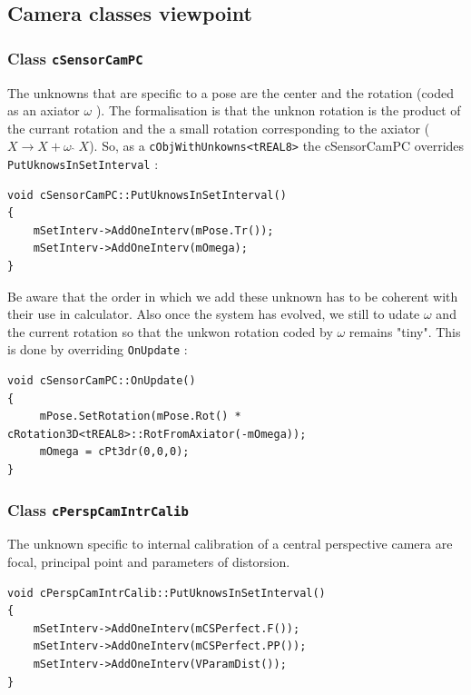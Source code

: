\subsection{Camera classes viewpoint}


\subsubsection{Class {\tt cSensorCamPC}}

The unknowns that are specific to a pose are the center  and  the rotation (coded as an axiator $\omega$ ).
The  formalisation is that the unknon rotation is the product of the currant rotation
and the a small rotation corresponding to the axiator ($X \rightarrow X + \omega\; \hat{}\; X$).
So, as a    {\tt cObjWithUnkowns<tREAL8>} the cSensorCamPC overrides {\tt PutUknowsInSetInterval} :

\begin{lstlisting}
void cSensorCamPC::PutUknowsInSetInterval()
{
    mSetInterv->AddOneInterv(mPose.Tr());
    mSetInterv->AddOneInterv(mOmega);
}
\end{lstlisting}

Be aware that the order in which we add these unknown has to be coherent with their use in calculator.
Also once the system has evolved, we still to udate $\omega$  and the current rotation
so that the unkwon rotation coded by $\omega$  remains "tiny". This is done  by
overriding {\tt OnUpdate} :


\begin{lstlisting}
void cSensorCamPC::OnUpdate()
{
     mPose.SetRotation(mPose.Rot() * cRotation3D<tREAL8>::RotFromAxiator(-mOmega));
     mOmega = cPt3dr(0,0,0);
}
\end{lstlisting}

\subsubsection{Class {\tt cPerspCamIntrCalib}}

The unknown specific to internal calibration of a central perspective camera are focal, principal 
point and parameters of distorsion. 


\begin{lstlisting}
void cPerspCamIntrCalib::PutUknowsInSetInterval()
{
    mSetInterv->AddOneInterv(mCSPerfect.F());
    mSetInterv->AddOneInterv(mCSPerfect.PP());
    mSetInterv->AddOneInterv(VParamDist());
}
\end{lstlisting}


